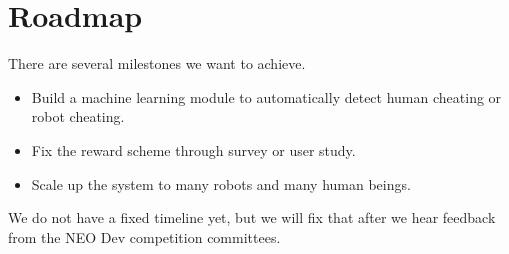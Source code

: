 \documentclass{article}
\begin{document}
\section{Roadmap}
\label{sec:roadmap}

There are several milestones we want to achieve.

\begin{itemize}
    \item Build a machine learning module to automatically detect
        human cheating or robot cheating.
    \item Fix the reward scheme through survey or user study.
    \item Scale up the \nrc system to many robots and many human 
        beings.
\end{itemize}

We do not have a fixed timeline yet, but we will fix that after
we hear feedback from the NEO Dev competition committees. 




\newpage

\small



\end{document}
